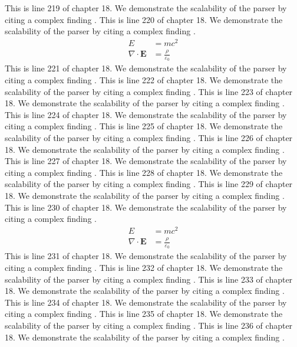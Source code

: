 This is line 219 of chapter 18. We demonstrate the scalability of the parser by citing a complex finding \cite{ref18_219}.
This is line 220 of chapter 18. We demonstrate the scalability of the parser by citing a complex finding \cite{ref18_220}.
\begin{align*}
  E &= mc^2 \\
  \nabla \cdot \mathbf{E} &= \frac{\rho}{\varepsilon_0}
\end{align*}
This is line 221 of chapter 18. We demonstrate the scalability of the parser by citing a complex finding \cite{ref18_221}.
This is line 222 of chapter 18. We demonstrate the scalability of the parser by citing a complex finding \cite{ref18_222}.
This is line 223 of chapter 18. We demonstrate the scalability of the parser by citing a complex finding \cite{ref18_223}.
This is line 224 of chapter 18. We demonstrate the scalability of the parser by citing a complex finding \cite{ref18_224}.
This is line 225 of chapter 18. We demonstrate the scalability of the parser by citing a complex finding \cite{ref18_225}.
This is line 226 of chapter 18. We demonstrate the scalability of the parser by citing a complex finding \cite{ref18_226}.
This is line 227 of chapter 18. We demonstrate the scalability of the parser by citing a complex finding \cite{ref18_227}.
This is line 228 of chapter 18. We demonstrate the scalability of the parser by citing a complex finding \cite{ref18_228}.
This is line 229 of chapter 18. We demonstrate the scalability of the parser by citing a complex finding \cite{ref18_229}.
This is line 230 of chapter 18. We demonstrate the scalability of the parser by citing a complex finding \cite{ref18_230}.
\begin{align*}
  E &= mc^2 \\
  \nabla \cdot \mathbf{E} &= \frac{\rho}{\varepsilon_0}
\end{align*}
This is line 231 of chapter 18. We demonstrate the scalability of the parser by citing a complex finding \cite{ref18_231}.
This is line 232 of chapter 18. We demonstrate the scalability of the parser by citing a complex finding \cite{ref18_232}.
This is line 233 of chapter 18. We demonstrate the scalability of the parser by citing a complex finding \cite{ref18_233}.
This is line 234 of chapter 18. We demonstrate the scalability of the parser by citing a complex finding \cite{ref18_234}.
This is line 235 of chapter 18. We demonstrate the scalability of the parser by citing a complex finding \cite{ref18_235}.
This is line 236 of chapter 18. We demonstrate the scalability of the parser by citing a complex finding \cite{ref18_236}.
